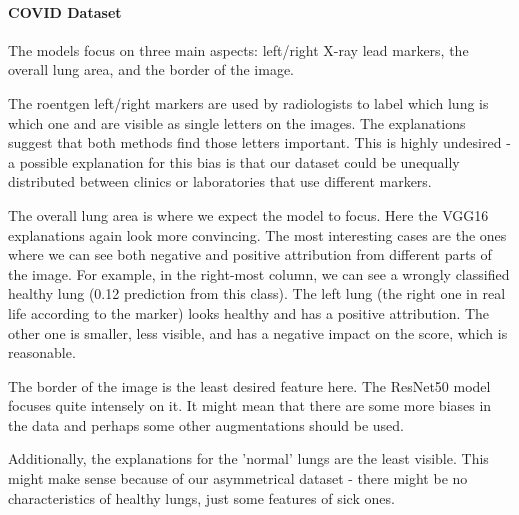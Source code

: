 \documentclass[twoside,11pt]{article}
\begin{document}
\paragraph{COVID Dataset}
The models focus on three main aspects: left/right X-ray lead markers, the overall lung area, and the border of the image.

The roentgen left/right markers are used by radiologists to label which lung is which one and are visible as single letters on the images. The explanations suggest that both methods find those letters important. This is highly undesired - a possible explanation for this bias is that our dataset could be unequally distributed between clinics or laboratories that use different markers.

The overall lung area is where we expect the model to focus. Here the VGG16 explanations again look more convincing. The most interesting cases are the ones where we can see both negative and positive attribution from different parts of the image. For example, in the right-most column, we can see a wrongly classified healthy lung (0.12 prediction from this class). The left lung (the right one in real life according to the marker) looks healthy and has a positive attribution. The other one is smaller, less visible, and has a negative impact on the score, which is reasonable.

The border of the image is the least desired feature here. The ResNet50 model focuses quite intensely on it. It might mean that there are some more biases in the data and perhaps some other augmentations should be used.

Additionally, the explanations for the 'normal' lungs are the least visible. This might make sense because of our asymmetrical  dataset - there might be no characteristics of healthy lungs, just some features of sick ones.


\end{document}
